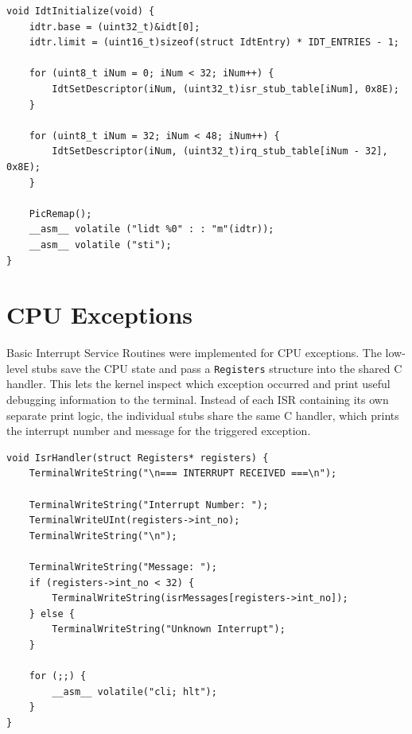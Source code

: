 \begin{listing}[H]
\begin{verbatim}
void IdtInitialize(void) {
    idtr.base = (uint32_t)&idt[0];
    idtr.limit = (uint16_t)sizeof(struct IdtEntry) * IDT_ENTRIES - 1;

    for (uint8_t iNum = 0; iNum < 32; iNum++) {
        IdtSetDescriptor(iNum, (uint32_t)isr_stub_table[iNum], 0x8E);
    }

    for (uint8_t iNum = 32; iNum < 48; iNum++) {
        IdtSetDescriptor(iNum, (uint32_t)irq_stub_table[iNum - 32], 0x8E);
    }

    PicRemap();
    __asm__ volatile ("lidt %0" : : "m"(idtr));
    __asm__ volatile ("sti");
}
\end{verbatim}
\caption{Initializing the IDT with CPU exception and hardware IRQ entries.}
\end{listing}
\clearpage

\section{CPU Exceptions}

Basic Interrupt Service Routines were implemented for CPU exceptions. The low-level stubs save the CPU state and pass a \texttt{Registers} structure into the shared C handler. This lets the kernel inspect which exception occurred and print useful debugging information to the terminal. Instead of each ISR containing its own separate print logic, the individual stubs share the same C handler, which prints the interrupt number and message for the triggered exception.

\begin{listing}[H]
\begin{verbatim}
void IsrHandler(struct Registers* registers) {
    TerminalWriteString("\n=== INTERRUPT RECEIVED ===\n");

    TerminalWriteString("Interrupt Number: ");
    TerminalWriteUInt(registers->int_no);
    TerminalWriteString("\n");

    TerminalWriteString("Message: ");
    if (registers->int_no < 32) {
        TerminalWriteString(isrMessages[registers->int_no]);
    } else {
        TerminalWriteString("Unknown Interrupt");
    }

    for (;;) {
        __asm__ volatile("cli; hlt");
    }
}
\end{verbatim}
\caption{Shared CPU exception handler using the saved interrupt number.}
\end{listing}

